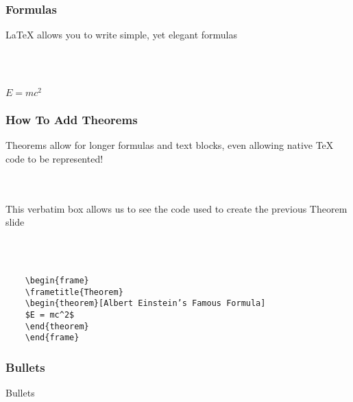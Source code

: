\documentclass{beamer}
\begin{document}

\begin{frame}
\frametitle{Formulas}

LaTeX allows you to write simple, yet elegant formulas

\\~\\

\begin{theorem}
$E = mc^2$
\end{theorem}
\end{frame}


\begin{frame}[fragile]
\frametitle{How To Add Theorems}

Theorems allow for longer formulas and text blocks, even allowing native TeX code to be represented!

\\~\\

This verbatim box allows us to see the code used to create the previous Theorem slide

\\~\\

\begin{example}
\begin{verbatim}
	\begin{frame}
	\frametitle{Theorem}
	\begin{theorem}[Albert Einstein’s Famous Formula]
	$E = mc^2$
	\end{theorem}
	\end{frame}\end{verbatim}
\end{example}
\end{frame}


\begin{frame}
\frametitle{Bullets}

Bullets
\end{frame}
\end{document}
